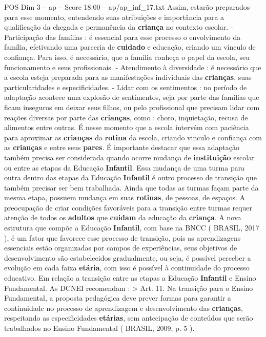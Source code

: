 \begin{textsample}{POS Dim 3 – ap – Score 18.00 – ap/ap\_inf\_17.txt}
Assim, estarão preparados para esse momento, entendendo suas atribuições e importância para a qualificação da chegada e permanência da \textbf{criança} no contexto escolar. - Participação das famílias : é essencial para esse processo o envolvimento da família, efetivando uma parceria de \textbf{cuidado} e educação, criando um vínculo de confiança.
Para isso, é necessário, que a família conheça o papel da escola, seu funcionamento e seus profissionais. - Atendimento à diversidade : é necessário que a escola esteja preparada para as manifestações individuais das \textbf{crianças}, suas particularidades e especificidades. - Lidar com os sentimentos : no período de adaptação acontece uma explosão de sentimentos, seja por parte das famílias que ficam inseguros em deixar seus filhos, ou pelo profissional que precisam lidar com reações diversas por parte das \textbf{crianças}, como : choro, inquietação, recusa de alimentos entre outras.
É nesse momento que a escola intervém com paciência para aproximar as \textbf{crianças} da \textbf{rotina} da escola, criando vinculo e confiança com as \textbf{crianças} e entre seus \textbf{pares}.
É importante destacar que essa adaptação também precisa ser considerada quando ocorre mudança de \textbf{instituição} escolar ou entre as etapas da Educação \textbf{Infantil}.
Essa mudança de uma turma para outra dentro das etapas da Educação \textbf{Infantil} é outro processo de transição que também precisar ser bem trabalhada.
Ainda que todas as turmas façam parte da mesma etapa, possuem mudança em suas \textbf{rotinas}, de pessoas, de espaços.
A preocupação de criar condições favoráveis para a transição entre turmas requer atenção de todos os \textbf{adultos} que \textbf{cuidam} da educação da \textbf{criança}.
A nova estrutura que compõe a Educação \textbf{Infantil}, com base na BNCC ( BRASIL, 2017 ), é um fator que favorece esse processo de transição, pois as aprendizagens essenciais estão organizadas por campos de experiências, seus objetivos de desenvolvimento são estabelecidos gradualmente, ou seja, é possível perceber a evolução em cada faixa \textbf{etária}, com isso é possível à continuidade do processo educativo.
Em relação a transição entre as etapas a Educação \textbf{Infantil} e Ensino Fundamental.
As DCNEI recomendam : > Art. 11.
Na transição para o Ensino Fundamental, a proposta pedagógica deve prever formas para garantir a continuidade no processo de aprendizagem e desenvolvimento das \textbf{crianças}, respeitando as especificidades \textbf{etárias}, sem antecipação de conteúdos que serão trabalhados no Ensino Fundamental ( BRASIL, 2009, p. 5 ).

\end{textsample}
